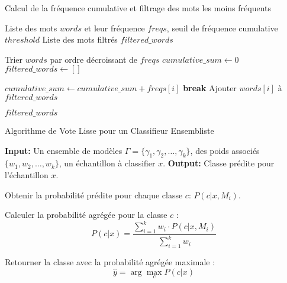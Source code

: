 \documentclass{article}
\begin{document}
\begin{algorithm}
\caption{Calcul de la fréquence cumulative et filtrage des mots les moins fréquents}
\begin{algorithmic}[1]
\Require Liste des mots $words$ et leur fréquence $freqs$, seuil de fréquence cumulative $threshold$
\Ensure Liste des mots filtrés $filtered\_words$

\State Trier $words$ par ordre décroissant de $freqs$
\State $cumulative\_sum \gets 0$
\State $filtered\_words \gets []$

    \State $cumulative\_sum \gets cumulative\_sum + freqs[i]$
        \State \textbf{break}
    \Else
        \State Ajouter $words[i]$ à $filtered\_words$
    \EndIf
\EndFor

\State \Return $filtered\_words$

\end{algorithmic}
\end{algorithm}
\begin{algorithm}
\caption{Algorithme de Vote Lisse pour un Classifieur Ensembliste}
\begin{algorithmic}[1]
\State \textbf{Input:} Un ensemble de modèles  $\Gamma = \{\gamma_1, \gamma_2, \dots, \gamma_k\}$, des poids associés $\{w_1, w_2, \dots, w_k\}$, un échantillon à classifier $x$.
\State \textbf{Output:} Classe prédite pour l'échantillon $x$.

    \State Obtenir la probabilité prédite pour chaque classe $c$: $P(c|x, M_i)$.
\EndFor

    \State Calculer la probabilité agrégée pour la classe $c$ :
    \[
    P(c|x) = \frac{\sum_{i=1}^k w_i \cdot P(c|x, M_i)}{\sum_{i=1}^k w_i}
    \]
\EndFor

\State Retourner la classe avec la probabilité agrégée maximale :
\[
\hat{y} = \arg\max_c P(c|x)
\]

\end{algorithmic}
\end{algorithm}
\end{document}

